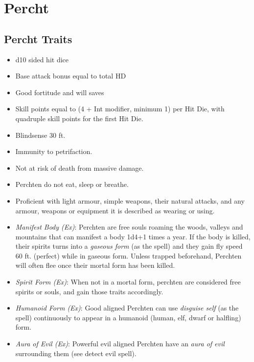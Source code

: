 \section{Percht}
\label{sec:monsters:Percht}

\subsection{Percht Traits}
\label{sec:Percht Traits}

\begin{itemize}[noitemsep]
  \item d10 sided hit dice
  \item Base attack bonus equal to total HD
  \item Good fortitude and will saves
  \item Skill points equal to (4 + Int modifier, minimum 1) per Hit Die, with
    quadruple skill points for the first Hit Die.
  \item Blindsense 30 ft.
  \item Immunity to petrifaction.
  \item Not at risk of death from massive damage.
  \item Perchten do not eat, sleep or breathe.
  \item Proficient with light armour, simple weapons, their natural attacks,
    and any armour, weapons or equipment it is described as wearing or using.
  \item \emph{Manifest Body (Ex)}: Perchten are free souls roaming the woods,
    valleys and mountains that can manifest a body 1d4+1 times a year. If
    the body is killed, their spirits turns into a \emph{gaseous form} (as
    the spell) and they gain fly speed 60 ft. (perfect) while in gaseous form.
    Unless trapped beforehand, Perchten will often flee once their mortal form
    has been killed.
  \item \emph{Spirit Form (Ex)}: When not in a mortal form, perchten are
    considered free spirits or souls, and gain those traits accordingly.
  \item \emph{Humanoid Form (Ex)}: Good aligned Perchten can use
    \emph{disguise self} (as the spell) continuously to appear in a humanoid
    (human, elf, dwarf or halfling) form.
  \item \emph{Aura of Evil (Ex)}: Powerful evil aligned Perchten have an
    \emph{aura of evil} surrounding them (see detect evil spell).
\end{itemize}

